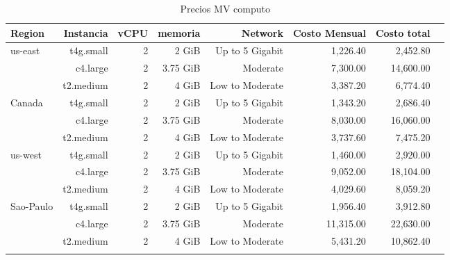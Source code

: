 \documentclass{article}
\begin{document}
\begin{table}[!htp]\centering

  \caption{Precios MV computo}\label{tab: }
  \scriptsize
  \begin{tabular}{lrrrrrrr}

  \toprule
  Region &Instancia &vCPU &memoria &Network &Costo Mensual &Costo total \\
  \midrule
  \multirow{3}{*}{us-east} &t4g.small &2 &2 GiB &Up to 5 Gigabit &1,226.40 &2,452.80 \\
  &c4.large &2 &3.75 GiB &Moderate &7,300.00 &14,600.00 \\
  &t2.medium &2 &4 GiB &Low to Moderate &3,387.20 &6,774.40 \\
  \midrule
  \multirow{3}{*}{Canada} &t4g.small &2 &2 GiB &Up to 5 Gigabit &1,343.20 &2,686.40 \\
  &c4.large &2 &3.75 GiB &Moderate &8,030.00 &16,060.00 \\
  &t2.medium &2 &4 GiB &Low to Moderate &3,737.60 &7,475.20 \\
  \midrule
  \multirow{3}{*}{us-west} &t4g.small &2 &2 GiB &Up to 5 Gigabit &1,460.00 &2,920.00 \\
  &c4.large &2 &3.75 GiB &Moderate &9,052.00 &18,104.00 \\
  &t2.medium &2 &4 GiB &Low to Moderate &4,029.60 &8,059.20 \\
  \midrule
  \multirow{3}{*}{Sao-Paulo} &t4g.small &2 &2 GiB &Up to 5 Gigabit &1,956.40 &3,912.80 \\
  &c4.large &2 &3.75 GiB &Moderate &11,315.00 &22,630.00 \\
  &t2.medium &2 &4 GiB &Low to Moderate &5,431.20 &10,862.40 \\
  \bottomrule

  \label{table:aws_computo}
  \end{tabular}
\end{table}
\end{document}
